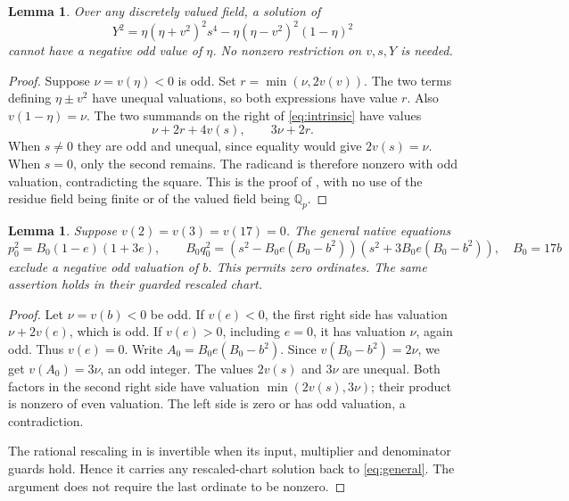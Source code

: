 \documentclass[11pt,a4paper]{article}
\newtheorem{lemma}[theorem]{Lemma}
\newcommand{\Q}{\mathbb Q}\newcommand{\Z}{\mathbb Z}
\begin{document}
\begin{lemma}\label{lem:intrinsic}
Over any discretely valued field, a solution of
\begin{equation}\label{eq:intrinsic}
 Y^2=\eta(\eta+v^2)^2s^4-
                 \eta(\eta-v^2)^2(1-\eta)^2
\end{equation}
cannot have a negative odd value of $\eta$.
No nonzero restriction on $v,s,Y$ is needed.
\end{lemma}
\begin{proof}
Suppose $\nu=v(\eta)<0$ is odd. Set
$r=\min(\nu,2v(v))$. The two terms defining $\eta\pm v^2$
have unequal valuations, so both expressions have value $r$.
Also $v(1-\eta)=\nu$. The two summands on the right of
\eqref{eq:intrinsic} have values
\[
                       \nu+2r+4v(s),\qquad3\nu+2r.
\]
When $s\ne0$ they are odd and unequal, since equality would give
$2v(s)=\nu$. When $s=0$, only the second remains. The radicand
is therefore nonzero with odd valuation, contradicting the square.
This is the proof of \cite[Theorem 1.1]{Intrinsic}, with no use of
the residue field being finite or of the valued field being $\Q_p$.
\end{proof}

\begin{lemma}\label{lem:general}
Suppose $v(2)=v(3)=v(17)=0$. The general native equations
\begin{equation}\label{eq:general}
 p_0^2=B_0(1-e)(1+3e),\qquad
 B_0q_0^2=(s^2-B_0e(B_0-b^2))(s^2+3B_0e(B_0-b^2)),
 \quad B_0=17b
\end{equation}
exclude a negative odd valuation of $b$. This permits zero ordinates.
The same assertion holds in their guarded rescaled chart.
\end{lemma}
\begin{proof}
Let $\nu=v(b)<0$ be odd. If $v(e)<0$, the first right side has
valuation $\nu+2v(e)$, which is odd. If $v(e)>0$, including
$e=0$, it has valuation $\nu$, again odd. Thus $v(e)=0$.
Write $A_0=B_0e(B_0-b^2)$. Since $v(B_0-b^2)=2\nu$, we get
$v(A_0)=3\nu$, an odd integer. The values $2v(s)$ and $3\nu$
are unequal. Both factors in the second right side have valuation
$\min(2v(s),3\nu)$; their product is nonzero of even valuation.
The left side is zero or has odd valuation, a contradiction.

The rational rescaling in \cite[Section 4]{Unit} is invertible when
its input, multiplier and denominator guards hold. Hence it carries
any rescaled-chart solution back to \eqref{eq:general}. The argument
does not require the last ordinate to be nonzero.
\end{proof}
\end{document}

